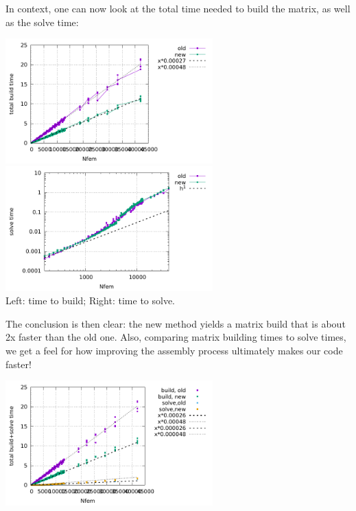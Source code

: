 In context, one can now look at the total time needed to build the matrix,
as well as the solve time:
\begin{center}
\includegraphics[width=8cm]{python_codes/fieldstone_176/results/build.pdf}
\includegraphics[width=8cm]{python_codes/fieldstone_176/results/solve.pdf}\\
{\captionfont Left: time to build; Right: time to solve.}
\end{center}
The conclusion is then clear: the new method yields a matrix build that 
is about 2x faster than the old one.
Also, comparing matrix building times to solve times, we get a feel for how 
improving the assembly process ultimately makes our code faster!
\begin{center}
\includegraphics[width=8cm]{python_codes/fieldstone_176/results/build_solve.pdf}
\end{center}



